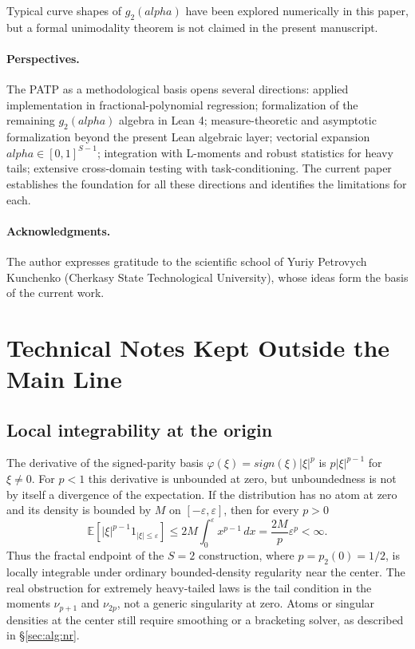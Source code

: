 \documentclass[11pt]{article}
\def\alpha{alpha}%
\def\vec#1{#1}%
\def\mathbf#1{#1}%
\def\mathrm#1{#1}%
\theoremstyle{definition}
\newcommand{\E}{\mathbb{E}}
\begin{document}
Typical curve shapes of $g_2(\alpha)$ have been explored numerically in this
paper, but a formal unimodality theorem is not claimed in the present
manuscript.

\paragraph{Perspectives.}
The PATP as a methodological basis opens several directions:
applied implementation in fractional-polynomial regression;
formalization of the remaining $g_2(\alpha)$ algebra in Lean 4;
measure-theoretic and asymptotic formalization beyond the present Lean
algebraic layer; vectorial expansion $\vec\alpha \in [0,1]^{S-1}$; integration with
L-moments and robust statistics for heavy tails; extensive
cross-domain testing with task-conditioning. The current paper establishes
the foundation for all these directions and identifies the limitations for each.

\paragraph{Acknowledgments.}
The author expresses gratitude to the scientific school of Yuriy Petrovych
Kunchenko (Cherkasy State Technological University), whose ideas form the
basis of the current work.


\appendix
\section{Technical Notes Kept Outside the Main Line}\label{app:technical}

\subsection{Local integrability at the origin}\label{app:local-integrability}

The derivative of the signed-parity basis
$\varphi(\xi)=\mathrm{sign}(\xi)|\xi|^p$ is
$p|\xi|^{p-1}$ for $\xi\neq0$.  For $p<1$ this derivative is unbounded at
zero, but unboundedness is not by itself a divergence of the expectation.
If the distribution has no atom at zero and its density is bounded by $M$ on
$[-\varepsilon,\varepsilon]$, then for every $p>0$
\[
  \E\!\left[|\xi|^{p-1}\mathbf{1}_{|\xi|\leq\varepsilon}\right]
  \leq
  2M\int_0^\varepsilon x^{p-1}\,dx
  =
  \frac{2M}{p}\varepsilon^p
  <\infty .
\]
Thus the fractal endpoint of the $S=2$ construction, where
$p=p_2(0)=1/2$, is locally integrable under ordinary bounded-density
regularity near the center.  The real obstruction for extremely heavy-tailed
laws is the tail condition in the moments $\nu_{p+1}$ and $\nu_{2p}$, not a
generic singularity at zero.  Atoms or singular densities at the center still
require smoothing or a bracketing solver, as described in
\S\ref{sec:alg:nr}.
\end{document}
